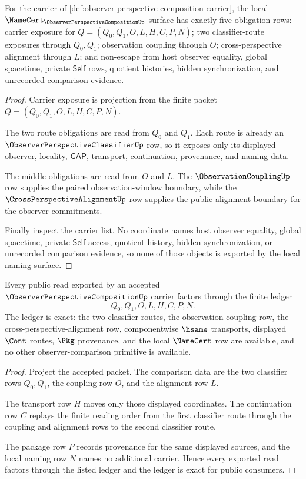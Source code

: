 \begin{theorem}
\label{thm:observer-perspective-composition-namecert-obligations}
For the carrier of \autoref{def:observer-perspective-composition-carrier}, the local $\NameCert_{\ObserverPerspectiveCompositionUp}$ surface has exactly five obligation rows: carrier exposure for $Q=(Q_0,Q_1,O,L,H,C,P,N)$; two classifier-route exposures through $Q_0,Q_1$; observation coupling through $O$; cross-perspective alignment through $L$; and non-escape from host observer equality, global spacetime, private $\mathsf{Self}$ rows, quotient histories, hidden synchronization, and unrecorded comparison evidence.
\end{theorem}
\begin{proof}
Carrier exposure is projection from the finite packet $Q=(Q_0,Q_1,O,L,H,C,P,N)$.

The two route obligations are read from $Q_0$ and $Q_1$. Each route is already an $\ObserverPerspectiveClassifierUp$ row, so it exposes only its displayed observer, locality, $\mathsf{GAP}$, transport, continuation, provenance, and naming data.

The middle obligations are read from $O$ and $L$. The $\ObservationCouplingUp$ row supplies the paired observation-window boundary, while the $\CrossPerspectiveAlignmentUp$ row supplies the public alignment boundary for the observer commitments.

Finally inspect the carrier list. No coordinate names host observer equality, global spacetime, private $\mathsf{Self}$ access, quotient history, hidden synchronization, or unrecorded comparison evidence, so none of those objects is exported by the local naming surface.
\end{proof}

\begin{theorem}
\label{thm:observer-perspective-composition-ledger-exactness}
Every public read exported by an accepted $\ObserverPerspectiveCompositionUp$ carrier factors through the finite ledger
$$
Q_0,Q_1,O,L,H,C,P,N.
$$
The ledger is exact: the two classifier routes, the observation-coupling row, the cross-perspective-alignment row, componentwise $\hsame$ transports, displayed $\Cont$ routes, $\Pkg$ provenance, and the local $\NameCert$ row are available, and no other observer-comparison primitive is available.
\end{theorem}
\begin{proof}
Project the accepted packet. The comparison data are the two classifier rows $Q_0,Q_1$, the coupling row $O$, and the alignment row $L$.

The transport row $H$ moves only those displayed coordinates. The continuation row $C$ replays the finite reading order from the first classifier route through the coupling and alignment rows to the second classifier route.

The package row $P$ records provenance for the same displayed sources, and the local naming row $N$ names no additional carrier. Hence every exported read factors through the listed ledger and the ledger is exact for public consumers.
\end{proof}

